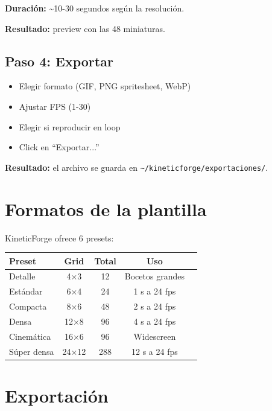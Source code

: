 \documentclass[12pt,a4paper]{article}
\begin{document}
\textbf{Duración:} \textasciitilde 10-30 segundos según la resolución.

\textbf{Resultado:} preview con las 48 miniaturas.

\subsection{Paso 4: Exportar}
\begin{itemize}[leftmargin=*]
    \item Elegir formato (GIF, PNG spritesheet, WebP)
    \item Ajustar FPS (1-30)
    \item Elegir si reproducir en loop
    \item Click en ``Exportar...''
\end{itemize}

\textbf{Resultado:} el archivo se guarda en \texttt{\textasciitilde/kineticforge/exportaciones/}.

\section{Formatos de la plantilla}

KineticForge ofrece 6 presets:

\begin{table}[h]
\centering
\begin{tabular}{@{}lcccc@{}}
\toprule
\textbf{Preset} & \textbf{Grid} & \textbf{Total} & \textbf{Uso} \\
\midrule
Detalle       & 4×3   & 12  & Bocetos grandes \\
Estándar      & 6×4   & 24  & 1 s a 24 fps \\
Compacta      & 8×6   & 48  & 2 s a 24 fps \\
Densa         & 12×8  & 96  & 4 s a 24 fps \\
Cinemática    & 16×6  & 96  & Widescreen \\
Súper densa   & 24×12 & 288 & 12 s a 24 fps \\
\bottomrule
\end{tabular}
\end{table}

\section{Exportación}
\end{document}
